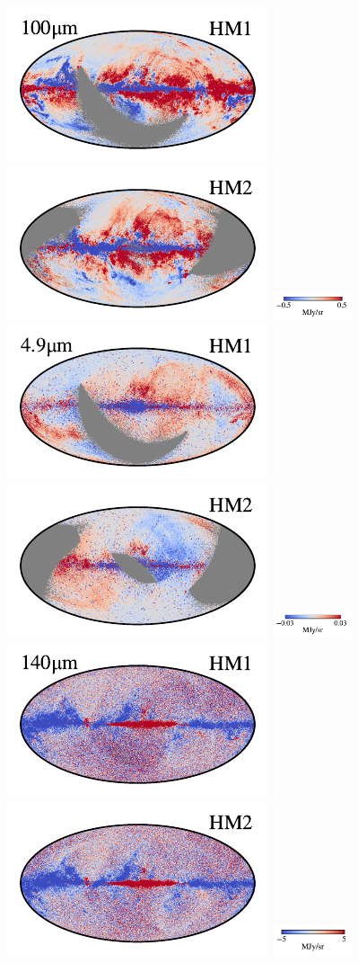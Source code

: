\documentclass[twocolumn]{aa}
\begin{document}
\begin{figure}[t]
    \includegraphics[width=0.22\linewidth]{figs/compare_zodi_res/cosmoglobe_res_08a.pdf}%
    \includegraphics[width=0.22\linewidth]{figs/compare_zodi_res/cosmoglobe_res_08b.pdf}%
    \includegraphics[width=23mm,angle=90]{figs/compare_zodi_res/cbar_08.pdf}\\
    \includegraphics[width=0.22\linewidth]{figs/compare_zodi_res/cosmoglobe_res_04a.pdf}%
    \includegraphics[width=0.22\linewidth]{figs/compare_zodi_res/cosmoglobe_res_04b.pdf}%
    \includegraphics[width=23mm,angle=90]{figs/compare_zodi_res/cbar_04.pdf}\hspace*{3mm}
    \includegraphics[width=0.22\linewidth]{figs/compare_zodi_res/cosmoglobe_res_09a.pdf}%
    \includegraphics[width=0.22\linewidth]{figs/compare_zodi_res/cosmoglobe_res_09b.pdf}%
    \includegraphics[width=23mm,angle=90]{figs/compare_zodi_res/cbar_09.pdf}\\

\end{figure}
\end{document}
